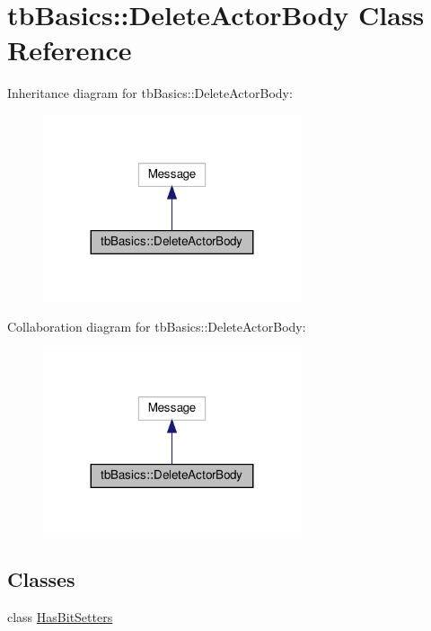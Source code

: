 \hypertarget{classtbBasics_1_1DeleteActorBody}{}\section{tb\+Basics\+:\+:Delete\+Actor\+Body Class Reference}
\label{classtbBasics_1_1DeleteActorBody}


Inheritance diagram for tb\+Basics\+:\+:Delete\+Actor\+Body\+:
\nopagebreak
\begin{figure}[H]
\begin{center}
\leavevmode
\includegraphics[width=215pt]{classtbBasics_1_1DeleteActorBody__inherit__graph}
\end{center}
\end{figure}


Collaboration diagram for tb\+Basics\+:\+:Delete\+Actor\+Body\+:
\nopagebreak
\begin{figure}[H]
\begin{center}
\leavevmode
\includegraphics[width=215pt]{classtbBasics_1_1DeleteActorBody__coll__graph}
\end{center}
\end{figure}
\subsection*{Classes}
\begin{DoxyCompactItemize}
\item 
class \hyperlink{classtbBasics_1_1DeleteActorBody_1_1HasBitSetters}{Has\+Bit\+Setters}
\end{DoxyCompactItemize}
